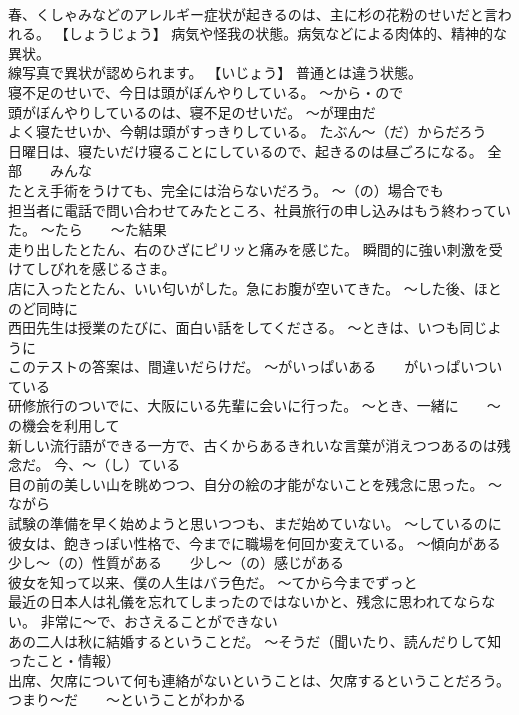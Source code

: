 \documentclass[8pt]{extreport}
\begin{document}
\begin{CJK}{UTF8}{min}
\\	春、くしゃみなどのアレルギー症状が起きるのは、主に杉の花粉のせいだと言われる。	【しょうじょう】 病気や怪我の状態。病気などによる肉体的、精神的な異状。
\\	線写真で異状が認められます。	【いじょう】 普通とは違う状態。
\\	寝不足のせいで、今日は頭がぼんやりしている。	～から・ので
\\	頭がぼんやりしているのは、寝不足のせいだ。	～が理由だ
\\	よく寝たせいか、今朝は頭がすっきりしている。	たぶん～（だ）からだろう
\\	日曜日は、寝たいだけ寝ることにしているので、起きるのは昼ごろになる。	全部　　みんな
\\	たとえ手術をうけても、完全には治らないだろう。	～（の）場合でも
\\	担当者に電話で問い合わせてみたところ、社員旅行の申し込みはもう終わっていた。	～たら　　～た結果
\\	走り出したとたん、右のひざにピリッと痛みを感じた。	瞬間的に強い刺激を受けてしびれを感じるさま。
\\	店に入ったとたん、いい匂いがした。急にお腹が空いてきた。	～した後、ほとのど同時に
\\	西田先生は授業のたびに、面白い話をしてくださる。	～ときは、いつも同じように
\\	このテストの答案は、間違いだらけだ。	～がいっぱいある　　がいっぱいついている
\\	研修旅行のついでに、大阪にいる先輩に会いに行った。	～とき、一緒に　　～の機会を利用して
\\	新しい流行語ができる一方で、古くからあるきれいな言葉が消えつつあるのは残念だ。	今、～（し）ている
\\	目の前の美しい山を眺めつつ、自分の絵の才能がないことを残念に思った。	～ながら
\\	試験の準備を早く始めようと思いつつも、まだ始めていない。	～しているのに
\\	彼女は、飽きっぽい性格で、今までに職場を何回か変えている。	～傾向がある　　少し～（の）性質がある　　少し～（の）感じがある
\\	彼女を知って以来、僕の人生はバラ色だ。	～てから今までずっと
\\	最近の日本人は礼儀を忘れてしまったのではないかと、残念に思われてならない。	非常に～で、おさえることができない
\\	あの二人は秋に結婚するということだ。	～そうだ（聞いたり、読んだりして知ったこと・情報）
\\	出席、欠席について何も連絡がないということは、欠席するということだろう。	つまり～だ　　～ということがわかる

\end{CJK}
\end{document}
